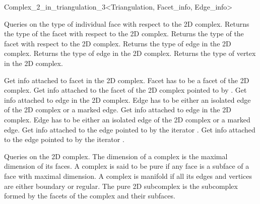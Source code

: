\begin{ccRefClass}{Complex_2_in_triangulation_3<Triangulation, Facet_info, Edge_info>}

Queries on the type of individual face with respect to the 2D complex.
{Returns the type of the facet   with respect to  the 2D complex.}
\ccGlue
{}
{Returns the type of the facet  with respect to  the 2D complex.}
\ccGlue
{}
{Returns the type of edge  in the 2D complex.}
\ccGlue
{}
{Returns the type of edge   in the 2D complex.}
\ccGlue
{}
{Returns the type of vertex  in the 2D complex.}

\ccGlue
{}

\ccGlue
{}
{Get info attached
to facet  in the 2D complex.
\ccPrecond Facet  has to be a facet of the 2D complex.}
\ccGlue
{}
{Get info attached to the facet of the 2D complex pointed
to by .}
\ccGlue
{}
{Get info attached
to edge  in the 2D complex.
\ccPrecond Edge  has to be either an isolated edge
of the 2D complex  or a marked edge.}
\ccGlue
{}
{Get info attached
to edge  in the 2D complex.
\ccPrecond Edge  has to be either an isolated edge
of the 2D complex  or a marked edge.}
\ccGlue
{}
{Get info attached
to the edge pointed to by the iterator .}
\ccGlue
{}
{Get info attached
to the edge pointed to by the iterator .}




Queries on the 2D complex. 
The dimension of a complex is the maximal dimension of its faces.
A complex is said to be pure if any face is a subface
of a face with maximal dimension. 
A complex is manifold if all its edges and vertices 
are either boundary or regular.
The  pure 2D subcomplex
is the subcomplex formed by the facets of the complex and their subfaces.


\end{ccRefClass}
